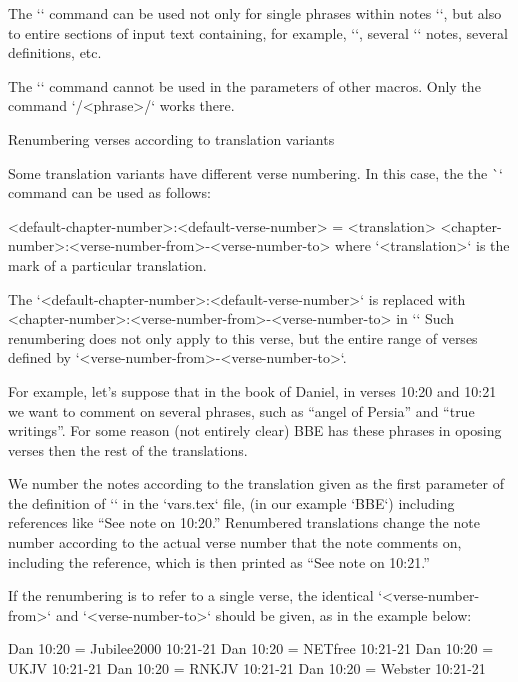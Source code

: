 {{The `\switch` command can be used not only for single phrases within notes
`\Note`, but also to entire sections of input text containing, for example, `\Note`,
several `\Note` notes, several definitions, etc.

The `\switch` command cannot be used in the parameters of other macros. Only the
command `\x/<phrase>/` works there.




\secc[renum] Renumbering verses according to translation variants

Some translation variants have different verse numbering. In this case, the
the \`\renum` command can be used as follows:

\begtt
{} <default-chapter-number>:<default-verse-number> = <translation> <chapter-number>:<verse-number-from>-<verse-number-to>
\endtt
where `<translation>` is the mark of a particular translation.

The `<default-chapter-number>:<default-verse-number>`  is replaced with 
<chapter-number>:<verse-number-from>-<verse-number-to> in `\def\tmark{<translation>}`
Such renumbering does not only apply to
this verse, but the entire range of verses defined by `<verse-number-from>-<verse-number-to>`.

For example, let's suppose that
in the book of Daniel, in verses 10:20 and 10:21 we want to comment on several phrases, such as “angel of Persia” and “true writings”. For some reason (not entirely clear) BBE has these phrases in oposing verses then the rest of the translations.

We number the notes according to the translation given as the first parameter of the definition of `\variants` in the `vars.tex` file, (in our example `BBE`) including references like “See note on 10:20.”
Renumbered translations change the note number according to the actual verse number that the note comments on, including the reference, which is then printed as “See note on 10:21.”

If the renumbering is to refer to a single verse, the identical 
`<verse-number-from>` and `<verse-number-to>`  should be given, as in the example below:

\begtt
\renum Dan 10:20 = Jubilee2000 10:21-21
\renum Dan 10:20 = NETfree 10:21-21
\renum Dan 10:20 = UKJV 10:21-21
\renum Dan 10:20 = RNKJV 10:21-21
\renum Dan 10:20 = Webster 10:21-21
\endtt



}}

